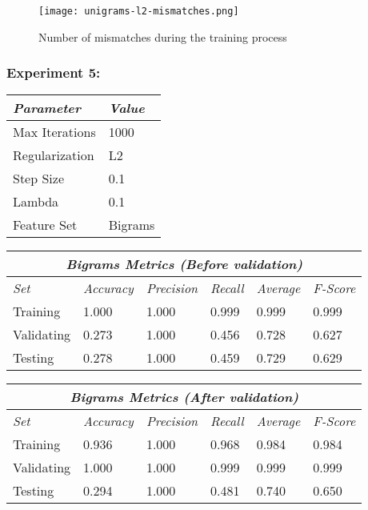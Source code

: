 \documentclass[11pt]{article}
\begin{document}
\begin{figure}[H]
  \caption{Number of mismatches during the training process}
  \texttt{[image: unigrams-l2-mismatches.png]}
  \centering
\end{figure}



\clearpage
\subsubsection*{Experiment 5:}

\begin{table}[H]
\centering
\begin{tabular}{ |p{3cm}||p{2cm}|  }
 \hline
 \textit{Parameter} & \textit{Value} \\
 \hline
 Max Iterations   & 1000 \\
 Regularization & L2 \\
 Step Size    & 0.1 \\
 Lambda    & 0.1 \\
 Feature Set    & Bigrams \\
 \hline
\end{tabular}
\end{table}

\begin{table}[H]
\centering
\begin{tabular}{ |p{2cm}||p{2cm}|p{2cm}|p{2cm}|p{2cm}|p{2cm}|  }
 \hline
 \multicolumn{6}{|c|}{\textbf{\textit{Bigrams Metrics (Before validation)}}} \\
 \hline
 \textit{Set} & \textit{Accuracy} & \textit{Precision} & \textit{Recall} & \textit{Average} & \textit{F-Score} \\
 \hline
 Training   & 1.000 & 1.000 & 0.999 & 0.999 & 0.999 \\
 Validating & 0.273 & 1.000 & 0.456 & 0.728 & 0.627 \\
 Testing    & 0.278 & 1.000 & 0.459 & 0.729 & 0.629 \\
 \hline
\end{tabular}
\end{table}

\begin{table}[H]
\centering
\begin{tabular}{ |p{2cm}||p{2cm}|p{2cm}|p{2cm}|p{2cm}|p{2cm}|  }
 \hline
 \multicolumn{6}{|c|}{\textbf{\textit{Bigrams Metrics (After validation)}}} \\
 \hline
 \textit{Set} & \textit{Accuracy} & \textit{Precision} & \textit{Recall} & \textit{Average} & \textit{F-Score} \\
 \hline
 Training   & 0.936 & 1.000 & 0.968 & 0.984 & 0.984 \\
 Validating & 1.000 & 1.000 & 0.999 & 0.999 & 0.999 \\
 Testing    & 0.294 & 1.000 & 0.481 & 0.740 & 0.650 \\
 \hline
\end{tabular}
\end{table}
\end{document}
